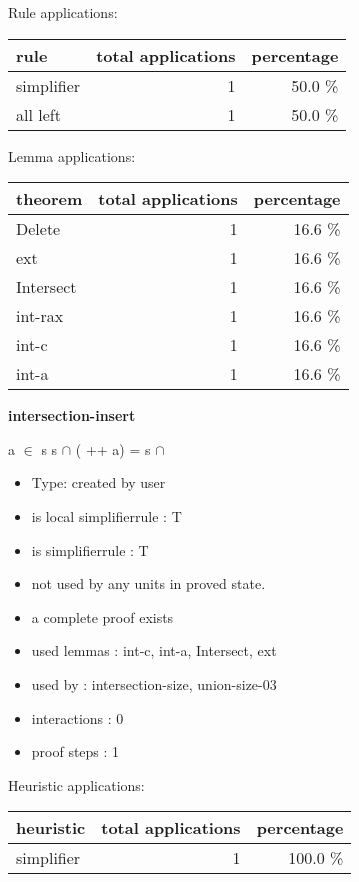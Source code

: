 \documentclass[a4paper]{article}
\begin{document}
Rule applications:

\begin{supertabular}{l|r|r}
rule	        & total applications & percentage \\ \hline
simplifier & 1 & 50.0 \% \\
all left & 1 & 50.0 \% \\

\end{supertabular}

Lemma applications:

\begin{supertabular}{l|r|r}
theorem	        & total applications & percentage \\ \hline
Delete & 1 & 16.6 \% \\
ext & 1 & 16.6 \% \\
Intersect & 1 & 16.6 \% \\
int-rax & 1 & 16.6 \% \\
int-c & 1 & 16.6 \% \\
int-a & 1 & 16.6 \% \\

\end{supertabular}
\pagebreak

{\LARGE\bf intersection-insert}\label{lemma-intersection-insert}

\medskip

 \Fol \Not a $\in$ s \Imp s $\cap$ ( ++ a) = s $\cap$ 

\begin{itemize}

\item Type: created by user

\item is local simplifierrule : T
\item is simplifierrule : T
\item not used by any units in proved state.
\item       a complete proof exists
\item       used lemmas  : int-c, int-a, Intersect, ext
\item       used by      : intersection-size, union-size-03
\item       interactions : 0
\item       proof steps  : 1
\end{itemize}

\medskip


Heuristic applications:

\begin{supertabular}{l|r|r}
heuristic	& total applications & percentage \\ \hline
simplifier & 1 & 100.0 \% \\

\end{supertabular}
\end{document}

